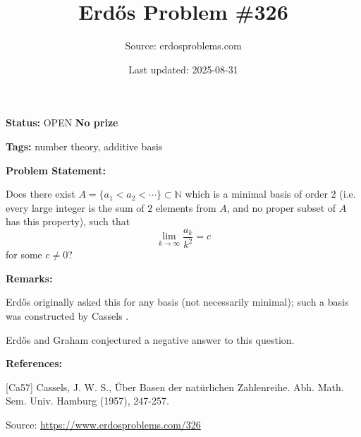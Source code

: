\documentclass{article}
\title{Erd\H{o}s Problem \#326}
\date{Last updated: 2025-08-31}
\author{Source: erdosproblems.com}
\begin{document}
\maketitle

\noindent\textbf{Status:} OPEN \quad \textbf{No prize}

\noindent\textbf{Tags:} number theory, additive basis

\medskip
\noindent\textbf{Problem Statement:}

Does there exist $A=\{a_1<a_2<\cdots\}\subset \mathbb{N}$ which is a minimal basis of order $2$ (i.e. every large integer is the sum of $2$ elements from $A$, and no proper subset of $A$ has this property), such that\[\lim_{k\to \infty}\frac{a_k}{k^2}=c\]for some $c\neq 0$?

\bigskip
\noindent\textbf{Remarks:}

Erd\H{o}s originally asked this for any basis (not necessarily minimal); such a basis was constructed by Cassels \cite{Ca57}.

Erd\H{o}s and Graham conjectured a negative answer to this question.

\bigskip
\noindent\textbf{References:}

[Ca57] Cassels, J. W. S., \"{U}ber Basen der nat\"{u}rlichen Zahlenreihe. Abh. Math. Sem. Univ. Hamburg (1957), 247-257.

\bigskip
\noindent\small{Source: \url{https://www.erdosproblems.com/326}}
\end{document}
